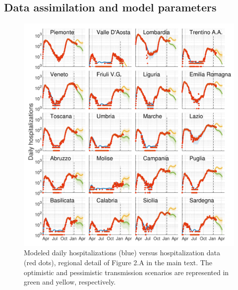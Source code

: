 \subsection*{Data assimilation and model parameters}
\begin{figure}
    \centering
    \includegraphics[width=1\textwidth]{fig_italy-ocp/figuresSI/DA_all_sim/hosp.pdf}
    \caption[Modeled daily hospitalizations the against hospitalization data]{Modeled daily hospitalizations (blue) versus hospitalization data (red dots), regional detail of Figure 2.A in the main text. The optimistic and pessimistic transmission scenarios are represented in green and yellow, respectively.}
    \label{fig:SI_DA1}
\end{figure}
